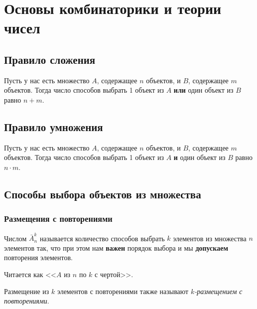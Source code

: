 \section{Основы комбинаторики и теории чисел}

\subsection{Правило сложения}

\begin{proposition}
	Пусть у нас есть множество $A$, содержащее $n$ объектов, и $B$, содержащее $m$ объектов. Тогда число способов выбрать 1 объект из $A$ \textbf{или} один объект из $B$ равно $n + m$.
\end{proposition}

\subsection{Правило умножения}

\begin{proposition}
	Пусть у нас есть множество $A$, содержащее $n$ объектов, и $B$, содержащее $m$ объектов. Тогда число способов выбрать 1 объект из $A$ \textbf{и} один объект из $B$ равно $n \cdot m$.
\end{proposition}

\subsection{Способы выбора объектов из множества}

\subsubsection*{Размещения с повторениями}

\begin{definition}
	Числом $\bar{A}_n^k$ называется количество способов выбрать $k$ элементов из множества $n$ элементов так, что при этом нам \textbf{важен} порядок выбора и мы \textbf{допускаем} повторения элементов.
\end{definition}

\begin{note}
	Читается как <<$A$ из $n$ по $k$ с чертой>>.
\end{note}

\begin{note}
	Размещение из $k$ элементов с повторениями также называют \textit{$k$-размещением с повторениями}.
\end{note}

